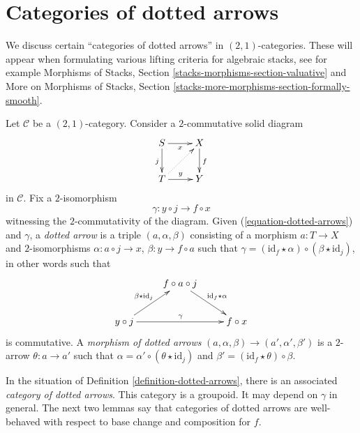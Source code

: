 \section{Categories of dotted arrows}
\label{section-dotted-arrows}

\noindent 
We discuss certain ``categories of dotted arrows'' in $(2,1)$-categories. 
These will appear when formulating various lifting criteria for 
algebraic stacks, see for example Morphisms of Stacks,
Section \ref{stacks-morphisms-section-valuative} and
More on Morphisms of Stacks, Section 
\ref{stacks-more-morphisms-section-formally-smooth}.

\begin{definition}
\label{definition-dotted-arrows}
Let $\mathcal{C}$ be a $(2,1)$-category. Consider a $2$-commutative 
solid diagram
\begin{equation}
\label{equation-dotted-arrows}
\vcenter{
\xymatrix{
S \ar[r]_-x \ar[d]_j & X \ar[d]^f \\
T \ar[r]^-y \ar@{..>}[ru] & Y
}
}
\end{equation}
in $\mathcal{C}$. Fix a $2$-isomorphism 
$$
\gamma : y \circ j \rightarrow f \circ x
$$
witnessing the $2$-commutativity of the diagram.
Given (\ref{equation-dotted-arrows}) and $\gamma$, a \emph{dotted arrow} 
is a triple $(a, \alpha, \beta)$ consisting of a morphism 
$a \colon T \to X$ and $2$-isomorphisms
$\alpha : a \circ j \to x$, $\beta : y \to f \circ a$
such that
$\gamma = (\text{id}_f \star \alpha) \circ (\beta \star \text{id}_j)$,
in other words such that
$$
\xymatrix{
& f \circ a \circ j \ar[rd]^{\text{id}_f \star \alpha} \\
y \circ j \ar[ru]^{\beta \star \text{id}_j} \ar[rr]^\gamma & &
f \circ x
}
$$
is commutative. A {\it morphism of dotted arrows}
$(a, \alpha, \beta) \to (a', \alpha', \beta')$ is a
$2$-arrow $\theta : a \to a'$ such that
$\alpha = \alpha' \circ (\theta \star \text{id}_j)$ and
$\beta' = (\text{id}_f \star \theta) \circ \beta$.
\end{definition}

\noindent
In the situation of Definition \ref{definition-dotted-arrows}, there 
is an associated \emph{category of dotted arrows}. 
This category is a groupoid. It may depend on $\gamma$ in general. 
The next two lemmas say that categories of dotted arrows 
are well-behaved with respect to base change and composition for $f$.

